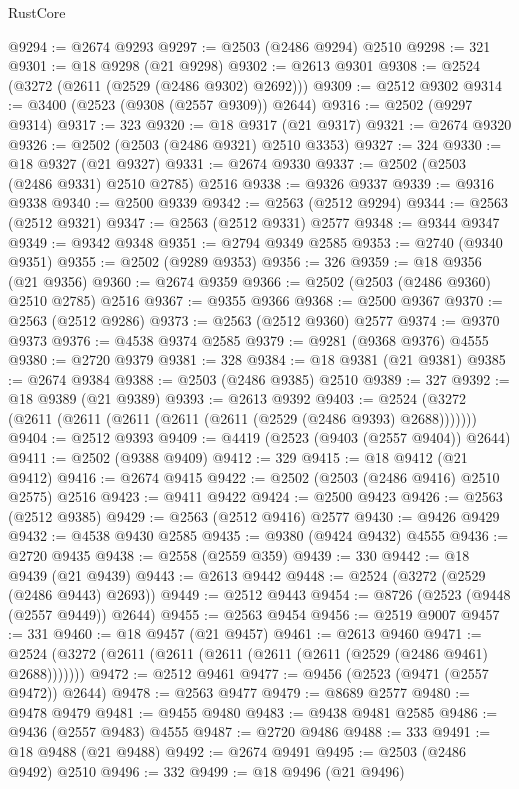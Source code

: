 \begin{lexlean}{RustCore}
\begin{coremodule}
@9294 := @2674 @9293
@9297 := @2503 (@2486 @9294) @2510
@9298 := 321
@9301 := @18 @9298 (@21 @9298)
@9302 := @2613 @9301
@9308 := @2524 (@3272 (@2611 (@2529 (@2486 @9302) @2692)))
@9309 := @2512 @9302
@9314 := @3400 (@2523 (@9308 (@2557 @9309)) @2644)
@9316 := @2502 (@9297 @9314)
@9317 := 323
@9320 := @18 @9317 (@21 @9317)
@9321 := @2674 @9320
@9326 := @2502 (@2503 (@2486 @9321) @2510 @3353)
@9327 := 324
@9330 := @18 @9327 (@21 @9327)
@9331 := @2674 @9330
@9337 := @2502 (@2503 (@2486 @9331) @2510 @2785) @2516
@9338 := @9326 @9337
@9339 := @9316 @9338
@9340 := @2500 @9339
@9342 := @2563 (@2512 @9294)
@9344 := @2563 (@2512 @9321)
@9347 := @2563 (@2512 @9331) @2577
@9348 := @9344 @9347
@9349 := @9342 @9348
@9351 := @2794 @9349 @2585
@9353 := @2740 (@9340 @9351)
@9355 := @2502 (@9289 @9353)
@9356 := 326
@9359 := @18 @9356 (@21 @9356)
@9360 := @2674 @9359
@9366 := @2502 (@2503 (@2486 @9360) @2510 @2785) @2516
@9367 := @9355 @9366
@9368 := @2500 @9367
@9370 := @2563 (@2512 @9286)
@9373 := @2563 (@2512 @9360) @2577
@9374 := @9370 @9373
@9376 := @4538 @9374 @2585
@9379 := @9281 (@9368 @9376) @4555
@9380 := @2720 @9379
@9381 := 328
@9384 := @18 @9381 (@21 @9381)
@9385 := @2674 @9384
@9388 := @2503 (@2486 @9385) @2510
@9389 := 327
@9392 := @18 @9389 (@21 @9389)
@9393 := @2613 @9392
@9403 := @2524 (@3272 (@2611 (@2611 (@2611 (@2611 (@2611 (@2529 (@2486 @9393) @2688)))))))
@9404 := @2512 @9393
@9409 := @4419 (@2523 (@9403 (@2557 @9404)) @2644)
@9411 := @2502 (@9388 @9409)
@9412 := 329
@9415 := @18 @9412 (@21 @9412)
@9416 := @2674 @9415
@9422 := @2502 (@2503 (@2486 @9416) @2510 @2575) @2516
@9423 := @9411 @9422
@9424 := @2500 @9423
@9426 := @2563 (@2512 @9385)
@9429 := @2563 (@2512 @9416) @2577
@9430 := @9426 @9429
@9432 := @4538 @9430 @2585
@9435 := @9380 (@9424 @9432) @4555
@9436 := @2720 @9435
@9438 := @2558 (@2559 @359)
@9439 := 330
@9442 := @18 @9439 (@21 @9439)
@9443 := @2613 @9442
@9448 := @2524 (@3272 (@2529 (@2486 @9443) @2693))
@9449 := @2512 @9443
@9454 := @8726 (@2523 (@9448 (@2557 @9449)) @2644)
@9455 := @2563 @9454
@9456 := @2519 @9007
@9457 := 331
@9460 := @18 @9457 (@21 @9457)
@9461 := @2613 @9460
@9471 := @2524 (@3272 (@2611 (@2611 (@2611 (@2611 (@2611 (@2529 (@2486 @9461) @2688)))))))
@9472 := @2512 @9461
@9477 := @9456 (@2523 (@9471 (@2557 @9472)) @2644)
@9478 := @2563 @9477
@9479 := @8689 @2577
@9480 := @9478 @9479
@9481 := @9455 @9480
@9483 := @9438 @9481 @2585
@9486 := @9436 (@2557 @9483) @4555
@9487 := @2720 @9486
@9488 := 333
@9491 := @18 @9488 (@21 @9488)
@9492 := @2674 @9491
@9495 := @2503 (@2486 @9492) @2510
@9496 := 332
@9499 := @18 @9496 (@21 @9496)

\end{coremodule}
\end{lexlean}
